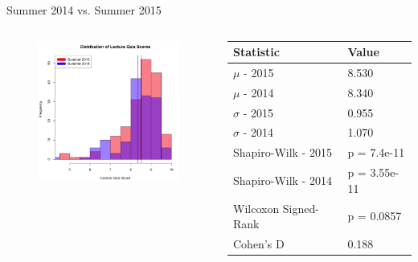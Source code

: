 \documentclass{beamer}
\begin{document}
\begin{frame}{Summer 2014 vs. Summer 2015}
\begin{columns}
\begin{column}{2in}
\begin{figure}
	\includegraphics[width=2in]{img/chapter4/lq_su15_vs_su14}
\end{figure}
\end{column}
\begin{column}{2in}
\begin{scriptsize}
\begin{table}
  \begin{tabular}{|l|l|}
    \hline
    \textbf{Statistic} & \textbf{Value} \\
	\hline
	$\mu$ - 2015 & 8.530 \\
	\hline
	$\mu$ - 2014 & 8.340 \\
	\hline
	$\sigma$ - 2015 & 0.955 \\
	\hline
	$\sigma$ - 2014 & 1.070 \\
	\hline
	Shapiro-Wilk - 2015 & p = 7.4e-11 \\
	\hline
	Shapiro-Wilk - 2014 & p = 3.55e-11 \\
	\hline
	Wilcoxon Signed-Rank & p = 0.0857 \\
	\hline
	Cohen's D & 0.188 \\
	\hline
  \end{tabular}
\end{table}
\end{scriptsize}
\end{column}
\end{columns}
\end{frame}
\end{document}
